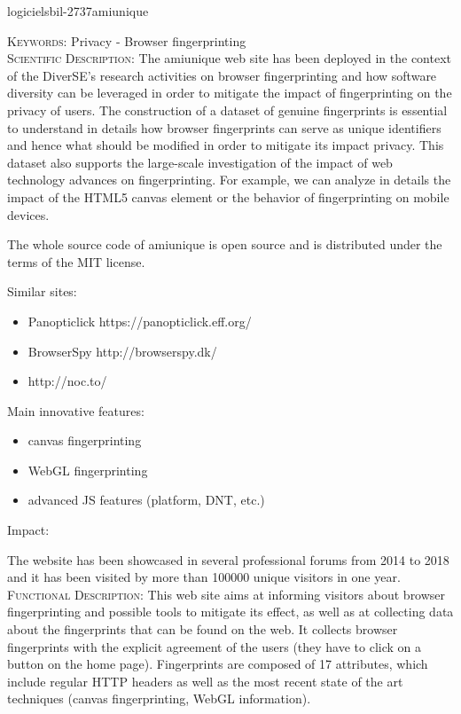 \documentclass{ra2018}
\begin{document}
 \begin{module}{logiciels}{bil-2737}{amiunique}
 	
 	\textsc{Keywords:} Privacy - Browser fingerprinting \\ 
 	
 	
 	\textsc{Scientific Description:} The amiunique web site has been deployed in the context of the DiverSE's research activities on browser fingerprinting and how software diversity can be leveraged in order to mitigate the impact of fingerprinting on the privacy of users. The construction of a dataset of genuine fingerprints is essential to understand in details how browser fingerprints can serve as unique identifiers and hence what should be modified in order to mitigate its impact privacy. This dataset also supports the large-scale investigation of the impact of web technology advances on fingerprinting. For example, we can analyze in details the impact of the HTML5 canvas element or the behavior of fingerprinting on mobile devices.
 	
 	The whole source code of amiunique is open source and is distributed under the terms of the MIT license.
 	
 	
 	Similar sites:
 	
 	\begin{itemize}
 		\item Panopticlick https://panopticlick.eff.org/
 		\item BrowserSpy http://browserspy.dk/
 		\item http://noc.to/
 	\end{itemize}
 	
 	Main innovative features:
 	\begin{itemize}
 		\item    canvas fingerprinting
 		\item WebGL fingerprinting
 		\item advanced JS features (platform, DNT, etc.)
 	\end{itemize}
 	Impact:
 	
 	The website has been showcased in several professional forums from 2014 to 2018  and it has been visited by more than 100000 unique visitors in one year.\\
 	
 	\textsc{Functional Description:}  This web site aims at informing visitors about browser fingerprinting and possible tools to mitigate its effect, as well as at collecting data about the fingerprints that can be found on the web. It collects browser fingerprints with the explicit agreement of the users (they have to click on a button on the home page). Fingerprints are composed of 17 attributes, which include regular HTTP headers as well as the most recent state of the art techniques (canvas fingerprinting, WebGL information).\\
 	

\end{module}
\end{document}

